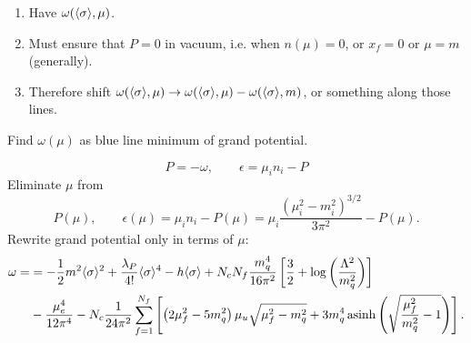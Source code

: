 \begin{enumerate}
\item Have $\omega(\langle \sigma \rangle, \mu)$.
\item Must ensure that $P = 0$ in vacuum, i.e. when $n(\mu) = 0$, or $x_f = 0$ or $\mu = m$ (generally).
\item Therefore shift $\omega(\langle \sigma \rangle,\mu) \rightarrow \omega(\langle \sigma \rangle,\mu) - \omega(\langle \sigma \rangle,m)$, or something along those lines.
\end{enumerate}

Find $\omega(\mu)$ as blue line minimum of grand potential.

\begin{equation}
	P = -\omega, \qquad
	\epsilon = \mu_i n_i - P
\end{equation}
Eliminate $\mu$ from
\begin{equation}
	P(\mu), \qquad
	\epsilon(\mu) = \mu_i n_i - P(\mu) = \mu_i \frac{(\mu_i^2-m_i^2)^{3/2}}{3 \pi^2} - P(\mu) .
\end{equation}
Rewrite grand potential only in terms of $\mu$:
\begin{equation}
\begin{split}
	\omega = &= -\frac12 m^2 \langle \sigma \rangle^2 + \frac{\lambda_P}{4!} \langle \sigma \rangle^4 - h \langle \sigma \rangle + N_c N_f \frac{m_q^4}{16 \pi^2} \left[ \frac{3}{2} + \log\left(\frac{{\Lambda}^2}{m_q^2}\right) \right] \\
	         &- \frac{\mu_e^4}{12 \pi^4} - N_c \frac{1}{24 \pi^2} \sum_{f=1}^{N_f} \left[ \left( 2 \mu_f^2 - 5 m_q^2 \right) \mu_u \sqrt{\mu_f^2 - m_q^2} + 3 m_q^4 \operatorname{asinh} \left( \sqrt{\frac{\mu_f^2}{m_q^2}-1} \right) \right] .
\end{split}
\label{eq:lsm:grand_potential}
\end{equation}










